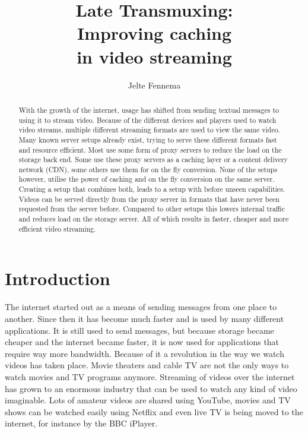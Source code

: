\documentclass[twoside,openright]{uva-bachelor-thesis}
\title{Late Transmuxing:\\Improving caching \\in video streaming}
\author{Jelte Fennema}
\begin{document}
\maketitle

\begin{abstract}
    With the growth of the internet, usage has shifted from sending textual
    messages to using it to stream video. Because of the different devices and
    players used to watch video streams, multiple different streaming formats
    are used to view the same video. Many known server setups already exist,
    trying to serve these different formats fast and resource efficient. Most
    use some form of proxy servers to reduce the load on the storage back end.
    Some use these proxy servers as a caching layer or a content delivery
    network (CDN), some others use them for on the fly conversion. None of the
    setups however, utilise the power of caching and on the fly conversion on
    the same server. Creating a setup that combines both, leads to a setup with
    before unseen capabilities. Videos can be served directly from the proxy
    server in formats that have never been requested from the server before.
    Compared to other setups this lowers internal traffic and reduces load on
    the storage server. All of which results in faster, cheaper and more
    efficient video streaming.

\end{abstract}


\tableofcontents

\chapter{Introduction}
The internet started out as a means of sending messages from one place to
another. Since then it has become much faster and is used by many different
applications. It is still used to send messages, but because storage became
cheaper and the internet became faster, it is now used for applications that
require way more bandwidth. Because of it a revolution in the way we watch videos
has taken place. Movie theaters and cable TV are not the only ways to watch
movies and TV programs anymore. Streaming of videos over the internet has grown
to an enormous industry that can be used to watch any kind of video imaginable.
Lots of amateur videos are shared using YouTube, movies and TV shows can be
watched easily using Netflix and even live TV is being moved to the internet,
for instance by the BBC iPlayer.
\end{document}
